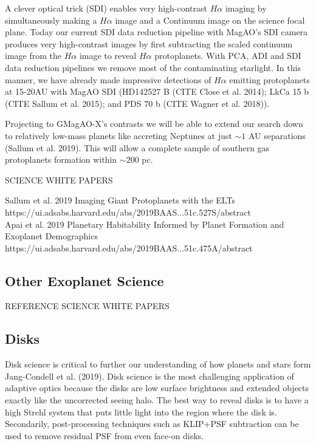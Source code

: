 \documentclass[12pt,preprint]{aastex}
\begin{document}
A clever optical trick (SDI) enables very high-contrast $H\alpha$ imaging by simultaneously making a $H\alpha$ image and a Continuum image on the science focal plane. Today our current SDI data reduction pipeline with MagAO's SDI camera produces very high-contrast images by first subtracting the scaled continuum image from the $H\alpha$ image to reveal $H\alpha$ protoplanets. With PCA, ADI and SDI data reduction pipelines we remove most of the contaminating starlight. In this manner, we have already made impressive detections of $H\alpha$ emitting protoplanets at 15-20AU with MagAO SDI (HD142527 B (CITE Close et al. 2014); LkCa 15 b (CITE Sallum et al. 2015); and PDS 70 b (CITE Wagner et al. 2018)). 

Projecting to  GMagAO-X's contrasts we will be able to extend our search down to relatively low-mass planets like accreting Neptunes at just $\sim1$ AU separations (Sallum et al. 2019). This will allow a complete sample of southern gas protoplanets formation within $\sim200$ pc. 

SCIENCE WHITE PAPERS

Sallum et al. 2019
Imaging Giant Protoplanets with the ELTs
\\https://ui.adsabs.harvard.edu/abs/2019BAAS...51c.527S/abstract\\
Apai et al. 2019  Planetary Habitability Informed by Planet Formation and Exoplanet Demographics
\\https://ui.adsabs.harvard.edu/abs/2019BAAS...51c.475A/abstract\\












\subsection{ Other Exoplanet Science}

REFERENCE SCIENCE WHITE PAPERS

\subsection{ Disks }
Disk science is critical to further our understanding of how planets and stars form Jang-Condell et al. (2019).
Disk science is the most challenging application of adaptive optics because
the disks are low surface brightness and extended objects exactly like the
uncorrected seeing halo. The best way to reveal disks is to have a high Strehl
system that puts little light into the region where the disk is. Secondarily,
post-processing techniques such as KLIP+PSF subtraction can be used to remove
residual PSF from even face-on disks.
\end{document}

